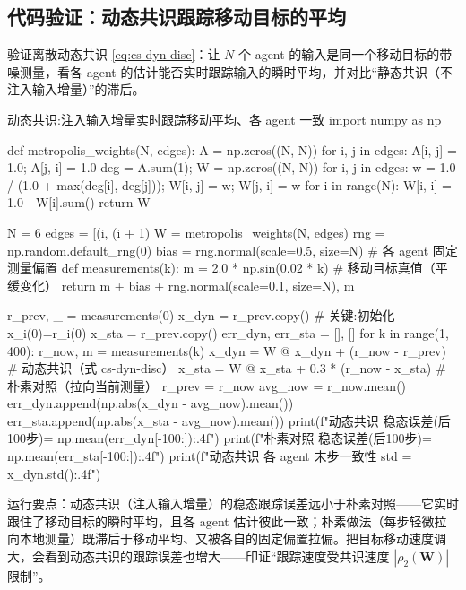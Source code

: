 \subsection{代码验证：动态共识跟踪移动目标的平均}
\label{sec:cs-dyn-code}

验证离散动态共识 \cref{eq:cs-dyn-disc}：让 $N$ 个 agent 的输入是同一个移动目标的带噪测量，看各 agent 的估计能否实时跟踪输入的瞬时平均，并对比“静态共识（不注入输入增量）”的滞后。

\begin{codebox}[Python]{动态共识:注入输入增量实时跟踪移动平均、各 agent 一致}
import numpy as np

def metropolis_weights(N, edges):
    A = np.zeros((N, N))
    for i, j in edges:
        A[i, j] = 1.0; A[j, i] = 1.0
    deg = A.sum(1); W = np.zeros((N, N))
    for i, j in edges:
        w = 1.0 / (1.0 + max(deg[i], deg[j])); W[i, j] = w; W[j, i] = w
    for i in range(N):
        W[i, i] = 1.0 - W[i].sum()
    return W

N = 6
edges = [(i, (i + 1) %
W = metropolis_weights(N, edges)
rng = np.random.default_rng(0)
bias = rng.normal(scale=0.5, size=N)                  # 各 agent 固定测量偏置
def measurements(k):
    m = 2.0 * np.sin(0.02 * k)                         # 移动目标真值（平缓变化）
    return m + bias + rng.normal(scale=0.1, size=N), m

r_prev, _ = measurements(0)
x_dyn = r_prev.copy()                                  # 关键:初始化 x_i(0)=r_i(0)
x_sta = r_prev.copy()
err_dyn, err_sta = [], []
for k in range(1, 400):
    r_now, m = measurements(k)
    x_dyn = W @ x_dyn + (r_now - r_prev)               # 动态共识（式 cs-dyn-disc）
    x_sta = W @ x_sta + 0.3 * (r_now - x_sta)          # 朴素对照（拉向当前测量）
    r_prev = r_now
    avg_now = r_now.mean()
    err_dyn.append(np.abs(x_dyn - avg_now).mean())
    err_sta.append(np.abs(x_sta - avg_now).mean())
print(f"动态共识 稳态误差(后100步)= {np.mean(err_dyn[-100:]):.4f}")
print(f"朴素对照 稳态误差(后100步)= {np.mean(err_sta[-100:]):.4f}")
print(f"动态共识 各 agent 末步一致性 std = {x_dyn.std():.4f}")
\end{codebox}

\noindent 运行要点：动态共识（注入输入增量）的稳态跟踪误差远小于朴素对照——它实时跟住了移动目标的瞬时平均，且各 agent 估计彼此一致；朴素做法（每步轻微拉向本地测量）既滞后于移动平均、又被各自的固定偏置拉偏。把目标移动速度调大，会看到动态共识的跟踪误差也增大——印证“跟踪速度受共识速度 $|\rho_2(\mathbf{W})|$ 限制”。


